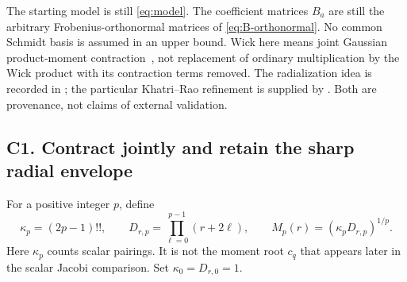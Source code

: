 \documentclass[11pt]{article}
\numberwithin{equation}{section}
\theoremstyle{definition}\newtheorem{definition}[theorem]{Definition}
\theoremstyle{remark}\newtheorem{remark}[theorem]{Remark}
\begin{document}
The starting model is still \eqref{eq:model}. The coefficient matrices $B_a$
are still the arbitrary Frobenius-orthonormal matrices of
\eqref{eq:B-orthonormal}. No common Schmidt basis is assumed in an upper bound.
Wick here means joint Gaussian product-moment contraction~\cite{Isserlis,Janson},
not replacement of ordinary multiplication by the Wick product with its
contraction terms removed. The radialization idea is recorded in
\cite{RMPS}; the particular Khatri--Rao refinement is supplied by
\cite{WickNote}. Both are provenance, not claims of external validation.

\subsection{C1. Contract jointly and retain the sharp radial envelope}\label{c:sec:wick-radial}
For a positive integer $p$, define
\begin{equation}\label{c:eq:wick-parameters}
 \kappa_p=(2p-1)!!,\qquad
 D_{r,p}=\prod_{\ell=0}^{p-1}(r+2\ell),\qquad
 M_p(r)=(\kappa_pD_{r,p})^{1/p}.
\end{equation}
Here $\kappa_p$ counts scalar pairings. It is not the moment root $c_q$ that
appears later in the scalar Jacobi comparison. Set $\kappa_0=D_{r,0}=1$.
\end{document}
